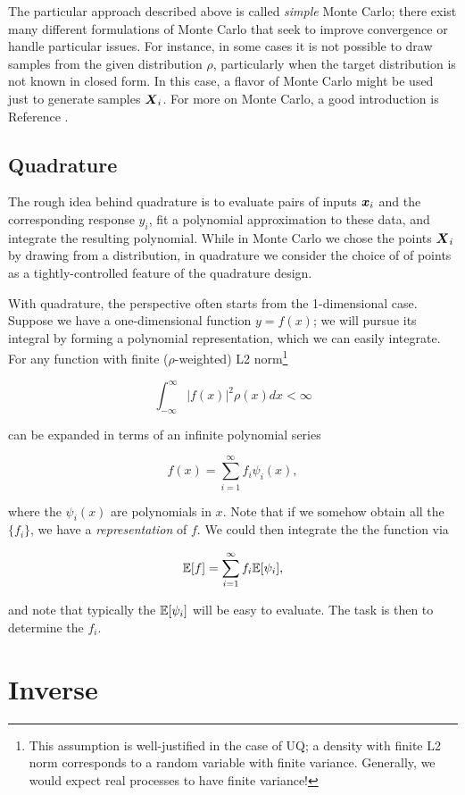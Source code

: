 \documentclass[../primer.tex]{subfiles}
\begin{document}
The particular approach described above is called \emph{simple} Monte Carlo;
there exist many different formulations of Monte Carlo that seek to improve
convergence or handle particular issues. For instance, in some cases it is not
possible to draw samples from the given distribution $\rho$, particularly when
the target distribution is not known in closed form. In this case, a flavor of
Monte Carlo might be used just to generate samples $\boldsymbol{X}_i$. For more on Monte
Carlo, a good introduction is Reference \cite{owen2013montecarlo}.

\subsection{Quadrature}
The rough idea behind quadrature is to evaluate pairs of inputs $\boldsymbol{x}_i$ and the
corresponding response $y_i$, fit a polynomial approximation to these data, and
integrate the resulting polynomial. While in Monte Carlo we chose the points
$\boldsymbol{X}_i$ by drawing from a distribution, in quadrature we consider the choice of
of points as a tightly-controlled feature of the quadrature design.

With quadrature, the perspective often starts from the 1-dimensional case.
Suppose we have a one-dimensional function $y = f(x)$; we will pursue its
integral by forming a polynomial representation, which we can easily integrate.
For any function with finite ($\rho$-weighted) L2 norm\footnote{This assumption
  is well-justified in the case of UQ; a density with finite L2 norm corresponds
  to a random variable with finite variance. Generally, we would expect real
  processes to have finite variance!}

\begin{equation}
  \int_{-\infty}^{\infty} |f(x)|^2 \rho(x) dx < \infty
\end{equation}

\noindent can be expanded in terms of an infinite polynomial series

\begin{equation}
  f(x) = \sum_{i=1}^{\infty} f_i \psi_i(x),
\end{equation}

\noindent where the $\psi_i(x)$ are polynomials in
$x$.\cite{cameron1947orthogonal} Note that if we somehow obtain all the
$\{f_i\}$, we have a \emph{representation} of $f$. We could then integrate the
the function via

\begin{equation}
  \mathbb{E}[f] = \sum_{i=1}^{\infty} f_i \mathbb{E}[\psi_i],
\end{equation}

\noindent and note that typically the $\mathbb{E}[\psi_i]$ will be easy to evaluate. The
task is then to determine the $f_i$.

\section{Inverse}
\end{document}
